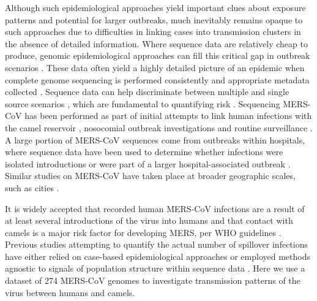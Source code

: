 \documentclass[9pt,lineno]{elife}
\begin{document}
Although such epidemiological approaches yield important clues about exposure patterns and potential for larger outbreaks, much inevitably remains opaque to such approaches due to difficulties in linking cases into transmission clusters in the absence of detailed information.
Where sequence data are relatively cheap to produce, genomic epidemiological approaches can fill this critical gap in outbreak scenarios \citep{liu_h7n9_2013,gire_genomic_2014,grubaugh_multiple_2017}.
These data often yield a highly detailed picture of an epidemic when complete genome sequencing is performed consistently and appropriate metadata collected \citep{dudas_virus_2017}.
Sequence data can help discriminate between multiple and single source scenarios \citep{gire_genomic_2014,quick_rapid_2015}, which are fundamental to quantifying risk \citep{grubaugh_multiple_2017}.
Sequencing MERS-CoV has been performed as part of initial attempts to link human infections with the camel reservoir \citep{memish_human_2014}, nosocomial outbreak investigations \citep{assiri_hospital_2013} and routine surveillance \citep{park_acute_2015}.
A large portion of MERS-CoV sequences come from outbreaks within hospitals, where sequence data have been used to determine whether infections were isolated introductions or were part of a larger hospital-associated outbreak \citep{fagbo_molecular_2015}.
Similar studies on MERS-CoV have taken place at broader geographic scales, such as cities \citep{cotten_2013}.


It is widely accepted that recorded human MERS-CoV infections are a result of at least several introductions of the virus into humans \citep{cotten_2013} and that contact with camels is a major risk factor for developing MERS, per WHO guidelines \citep{who_mers_guidelines_2016}.
Previous studies attempting to quantify the actual number of spillover infections have either relied on case-based epidemiological approaches \citep{cauchemez_unraveling_2016} or employed methods agnostic to signals of population structure within sequence data \citep{zhang_evolutionary_2016}.
Here we use a dataset of 274 MERS-CoV genomes to investigate transmission patterns of the virus between humans and camels.
\end{document}
